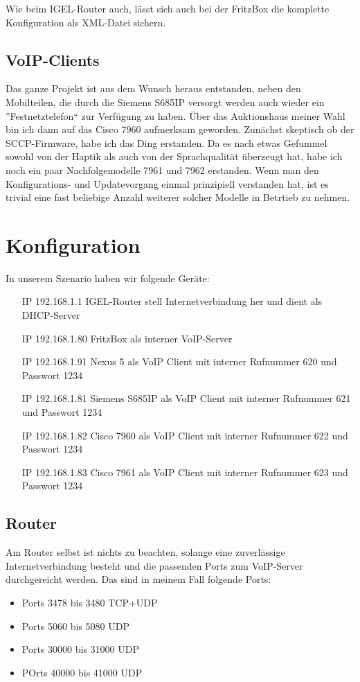 \documentclass[a4paper,12pt]{scrbook}
\begin{document}
Wie beim IGEL-Router auch, lässt sich auch bei der FritzBox die komplette Konfiguration als XML-Datei sichern.


\section{VoIP-Clients}
Das ganze Projekt ist aus dem Wunsch heraus entstanden, neben den Mobilteilen, die durch die Siemens S685IP versorgt werden auch wieder ein
''Festnetztelefon`` zur Verfügung zu haben. Über das Auktionshaus meiner Wahl bin ich dann auf das Cisco 7960 aufmerksam geworden. Zunächst
skeptisch ob der SCCP-Firmware, habe ich das Ding erstanden. Da es nach etwas Gefummel sowohl von der Haptik als auch von der Sprachqualität 
überzeugt hat, habe ich noch ein paar Nachfolgemodelle 7961 und 7962 erstanden. Wenn man den Konfigurations- und Updatevorgang einmal prinzipiell
verstanden hat, ist es trivial eine fast beliebige Anzahl weiterer solcher Modelle in Betrtieb zu nehmen. 

\chapter{Konfiguration}
In unserem Szenario haben wir folgende Geräte:
\begin{itemize}
 \item[IP 192.168.1.1]  IGEL-Router stell Internetverbindung her und dient als DHCP-Server
 \item[IP 192.168.1.80] FritzBox als interner VoIP-Server
 \item[IP 192.168.1.91] Nexus 5 als VoIP Client mit interner Rufnummer 620 und Passwort 1234
 \item[IP 192.168.1.81] Siemens S685IP als VoIP Client mit interner Rufnummer 621 und Passwort 1234
 \item[IP 192.168.1.82] Cisco 7960 als VoIP Client mit interner Rufnummer 622 und Passwort 1234
 \item[IP 192.168.1.83] Cisco 7961 als VoIP Client mit interner Rufnummer 623 und Passwort 1234
\end{itemize}

\section{Router}
Am Router selbst ist nichts zu beachten, solange eine zuverlässige Internetverbindung besteht und die passenden Ports zum VoIP-Server durchgereicht werden.
Das sind in meinem Fall folgende Ports:
\begin{itemize}
 \item Ports 3478 bis 3480 TCP+UDP
 \item Ports 5060 bis 5080 UDP
 \item Ports 30000 bis 31000 UDP
 \item POrts 40000 bis 41000 UDP
\end{itemize}
\end{document}
